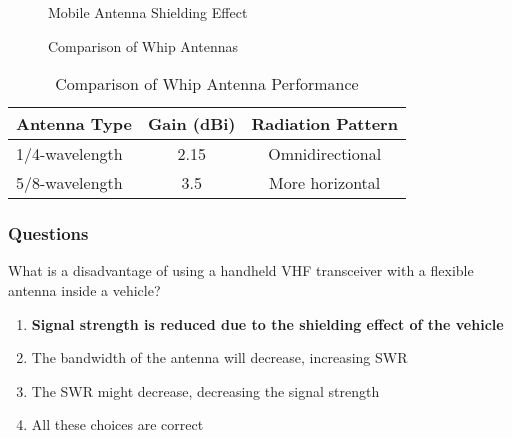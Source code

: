 \begin{figure}[h]
    \centering
    \caption{Mobile Antenna Shielding Effect}
    \label{fig:mobile-shielding}
\end{figure}

\begin{figure}[h]
    \centering
    \caption{Comparison of Whip Antennas}
    \label{fig:whip-comparison}
\end{figure}

\begin{table}[h]
    \centering
    \caption{Comparison of Whip Antenna Performance}
    \label{tab:whip-performance}
    \begin{tabular}{|l|c|c|}
        \hline
        \textbf{Antenna Type} & \textbf{Gain (dBi)} & \textbf{Radiation Pattern} \\
        \hline
        1/4-wavelength & 2.15 & Omnidirectional \\
        5/8-wavelength & 3.5 & More horizontal \\
        \hline
    \end{tabular}
\end{table}

\subsubsection{Questions}

\begin{tcolorbox}[colback=gray!10!white,colframe=black!75!black,title={T9A07}]
    What is a disadvantage of using a handheld VHF transceiver with a flexible antenna inside a vehicle?
    \begin{enumerate}[label=\Alph*),noitemsep]
        \item \textbf{Signal strength is reduced due to the shielding effect of the vehicle}
        \item The bandwidth of the antenna will decrease, increasing SWR
        \item The SWR might decrease, decreasing the signal strength
        \item All these choices are correct
    \end{enumerate}
\end{tcolorbox}

